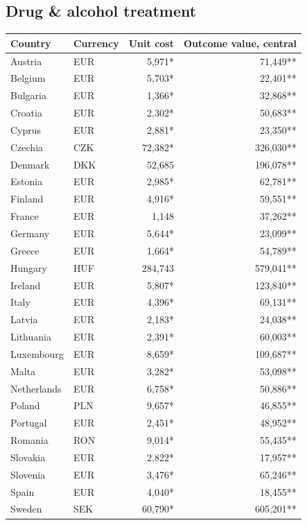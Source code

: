 \subsection*{Drug \& alcohol treatment}
\begin{longtable}{llrr}
\toprule
Country & Currency & Unit cost & Outcome value, central \\
\midrule
\endhead
Austria & EUR & 5,971* & 71,449** \\
Belgium & EUR & 5,703* & 22,401** \\
Bulgaria & EUR & 1,366* & 32,868** \\
Croatia & EUR & 2,302* & 50,683** \\
Cyprus & EUR & 2,881* & 23,350** \\
Czechia & CZK & 72,382* & 326,030** \\
Denmark & DKK & 52,685 & 196,078** \\
Estonia & EUR & 2,985* & 62,781** \\
Finland & EUR & 4,916* & 59,551** \\
France & EUR & 1,148 & 37,262** \\
Germany & EUR & 5,644* & 23,099** \\
Greece & EUR & 1,664* & 54,789** \\
Hungary & HUF & 284,743 & 579,041** \\
Ireland & EUR & 5,807* & 123,840** \\
Italy & EUR & 4,396* & 69,131** \\
Latvia & EUR & 2,183* & 24,038** \\
Lithuania & EUR & 2,391* & 60,003** \\
Luxembourg & EUR & 8,659* & 109,687** \\
Malta & EUR & 3,282* & 53,098** \\
Netherlands & EUR & 6,758* & 50,886** \\
Poland & PLN & 9,657* & 46,855** \\
Portugal & EUR & 2,451* & 48,952** \\
Romania & RON & 9,014* & 55,435** \\
Slovakia & EUR & 2,822* & 17,957** \\
Slovenia & EUR & 3,476* & 65,246** \\
Spain & EUR & 4,040* & 18,455** \\
Sweden & SEK & 60,790* & 605,201** \\
\bottomrule
\end{longtable}
